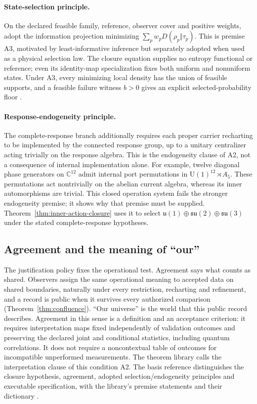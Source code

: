 \documentclass[11pt]{article}
\theoremstyle{definition}
\theoremstyle{remark}
\begin{document}
\paragraph{State-selection principle.} On the declared feasible family,
reference, observer cover and positive weights, adopt the information
projection minimizing $\sum_pw_pD(\rho_p\Vert\tau_p)$. This is premise A3,
motivated by least-informative inference but separately adopted when used
as a physical selection law. The closure equation supplies no entropy
functional or reference; even its identity-map specialization fixes both
uniform and nonuniform states. Under A3, every minimizing local density has
the union of feasible supports, and a feasible failure witness $b>0$ gives
an explicit selected-probability floor \cite{ophEinstein}.

\paragraph{Response-endogeneity principle.} The complete-response branch
additionally requires each proper carrier recharting to be implemented by
the connected response group, up to a unitary centralizer acting trivially
on the response algebra. This is the endogeneity clause of A2, not a
consequence of internal implementation alone. For example, twelve diagonal
phase generators on $\mathbb C^{12}$ admit internal port permutations in
$\mathrm U(1)^{12}\rtimes A_5$. These permutations act nontrivially on the
abelian current algebra, whereas its inner automorphisms are trivial. This
closed operation system fails the stronger endogeneity premise; it shows
why that premise must be supplied. Theorem~\ref{thm:inner-action-closure}
uses it to select $\mathfrak u(1)\oplus\mathfrak{su}(2)\oplus\mathfrak{su}(3)$
under the stated complete-response hypotheses.

\subsection{Agreement and the meaning of ``our''}

The justification policy fixes the operational test. Agreement says what
counts as shared. Observers assign the same operational meaning to accepted
data on shared boundaries, naturally under every restriction, recharting and
refinement, and a record is public when it survives every authorized
comparison (Theorem~\ref{thm:confluence}). ``Our universe'' is the world
that this public record describes. Agreement in this sense is a definition
and an acceptance criterion: it requires interpretation maps fixed independently
of validation outcomes and preserving the declared joint and conditional
statistics, including quantum correlations. It does not require a
noncontextual table of outcomes for incompatible unperformed measurements.
The theorem library calls the interpretation clause of this condition A2.
The basis reference distinguishes the closure hypothesis, agreement,
adopted selection/endogeneity principles and executable specification, with
the library's premise statements and their dictionary \cite{ophbasis}.
\end{document}

